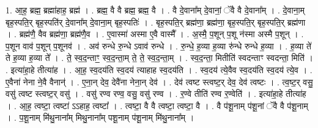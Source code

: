 \documentclass[17pt]{extarticle}
\begin{document}
1. आ॒ह॒ ब्रह्म॒ ब्रह्मा॑हाह॒ ब्रह्म॑ । . ब्रह्म॒ वै वै ब्रह्म॒ ब्रह्म॒ वै । . वै दे॒वाना᳚म् दे॒वानां॒ ॅवै वै दे॒वाना᳚म् । . दे॒वाना॒म् बृह॒स्पति॒र् बृह॒स्पति॑र् दे॒वाना᳚म् दे॒वाना॒म् बृह॒स्पतिः॑ । . बृह॒स्पति॒र् ब्रह्म॑णा॒ ब्रह्म॑णा॒ बृह॒स्पति॒र् बृह॒स्पति॒र् ब्रह्म॑णा । . ब्रह्म॑णै॒ वैव ब्रह्म॑णा॒ ब्रह्म॑णै॒व । . ए॒वास्मा॑ अस्मा ए॒वै वास्मै᳚ । . अ॒स्मै॒ प॒शून् प॒शू न॑स्मा अस्मै प॒शून् । . प॒शून वाव॑ प॒शून् प॒शूनव॑ । . अव॑ रुन्धे रु॒न्धे ऽवाव॑ रुन्धे । . रु॒न्धे॒ ह॒व्या ह॒व्या रु॑न्धे रुन्धे ह॒व्या । . ह॒व्या ते॑ ते ह॒व्या ह॒व्या ते᳚ । . ते॒ स्व॒द॒न्ताꣳ॒॒ स्व॒द॒न्ता॒म् ते॒ ते॒ स्व॒द॒न्ता॒म् । . स्व॒द॒न्ता॒ मितीति॑ स्वदन्ताꣳ स्वदन्ता॒ मिति॑ । . इत्या॑हा॒हे तीत्या॑ह । . आ॒ह॒ स्व॒दय॑ति स्व॒दय॑ त्याहाह स्व॒दय॑ति । . स्व॒दय॑ त्ये॒वैव स्व॒दय॑ति स्व॒दय॑ त्ये॒व । . ए॒वैना॑ नेना ने॒वै वैनान्॑ । . ए॒ना॒न् देव॒ देवै॑ना नेना॒न् देव॑ । . देव॑ त्वष्ट स्त्वष्ट॒र् देव॒ देव॑ त्वष्टः । . त्व॒ष्ट॒र् वसु॒ वसु॑ त्वष्ट स्त्वष्ट॒र् वसु॑ । . वसु॑ रण्व रण्व॒ वसु॒ वसु॑ रण्व । . र॒ण्वे तीति॑ रण्व र॒ण्वेति॑ । . इत्या॑हा॒हे तीत्या॑ह । . आ॒ह॒ त्वष्टा॒ त्वष्टा॑ ऽऽहाह॒ त्वष्टा᳚ । . त्वष्टा॒ वै वै त्वष्टा॒ त्वष्टा॒ वै । . वै प॑शू॒नाम् प॑शू॒नां ॅवै वै प॑शू॒नाम् । . प॒शू॒नाम् मि॑थु॒नाना᳚म् मिथु॒नाना᳚म् पशू॒नाम् प॑शू॒नाम् मि॑थु॒नाना᳚म् । \newline
\end{document}
